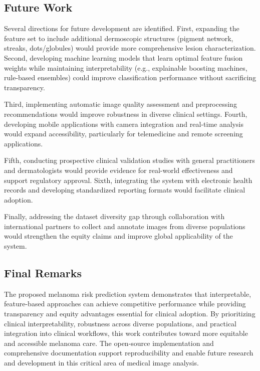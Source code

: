 \documentclass[conference]{IEEEtran}
\begin{document}
\subsection{Future Work}

Several directions for future development are identified. First, expanding the feature set to include additional dermoscopic structures (pigment network, streaks, dots/globules) would provide more comprehensive lesion characterization. Second, developing machine learning models that learn optimal feature fusion weights while maintaining interpretability (e.g., explainable boosting machines, rule-based ensembles) could improve classification performance without sacrificing transparency.

Third, implementing automatic image quality assessment and preprocessing recommendations would improve robustness in diverse clinical settings. Fourth, developing mobile applications with camera integration and real-time analysis would expand accessibility, particularly for telemedicine and remote screening applications.

Fifth, conducting prospective clinical validation studies with general practitioners and dermatologists would provide evidence for real-world effectiveness and support regulatory approval. Sixth, integrating the system with electronic health records and developing standardized reporting formats would facilitate clinical adoption.

Finally, addressing the dataset diversity gap through collaboration with international partners to collect and annotate images from diverse populations would strengthen the equity claims and improve global applicability of the system.

\subsection{Final Remarks}

The proposed melanoma risk prediction system demonstrates that interpretable, feature-based approaches can achieve competitive performance while providing transparency and equity advantages essential for clinical adoption. By prioritizing clinical interpretability, robustness across diverse populations, and practical integration into clinical workflows, this work contributes toward more equitable and accessible melanoma care. The open-source implementation and comprehensive documentation support reproducibility and enable future research and development in this critical area of medical image analysis.
\end{document}
